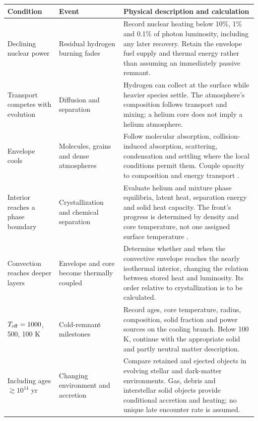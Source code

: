 {\small\renewcommand{\arraystretch}{1.16}
\begin{tabular}{@{}>{\raggedright\arraybackslash}p{}
 >{\raggedright\arraybackslash}p{}
 >{\raggedright\arraybackslash}p{}@{}}
\toprule
Condition & Event & Physical description and calculation \\\midrule
Declining nuclear power & Residual hydrogen burning fades &
Record nuclear heating below 10\%, 1\% and 0.1\% of photon luminosity,
including any later recovery. Retain the envelope fuel supply and thermal
energy rather than assuming an immediately passive remnant. \\[4pt]
Transport competes with evolution & Diffusion and separation &
Hydrogen can collect at the surface while heavier species settle. The
atmosphere's composition follows transport and mixing; a helium core does
not imply a helium atmosphere. \\[4pt]
Envelope cools & Molecules, grains and dense atmospheres &
Follow molecular absorption, collision-induced absorption, scattering,
condensation and settling where the local conditions permit them. Couple
opacity to composition and energy transport \cite{chabrier00,blouin18}. \\[4pt]
Interior reaches a phase boundary & Crystallization and chemical separation &
Evaluate helium and mixture phase equilibria, latent heat, separation energy
and solid heat capacity. The front's progress is determined by density and
core temperature, not one assigned surface temperature \cite{baiko22}. \\[4pt]
Convection reaches deeper layers & Envelope and core become thermally coupled &
Determine whether and when the convective envelope reaches the nearly
isothermal interior, changing the relation between stored heat and luminosity.
Its order relative to crystallization is to be calculated. \\[4pt]
$T_{\rm eff}=1000$, 500, 100 K & Cold-remnant milestones &
Record ages, core temperature, radius, composition, solid fraction and power
sources on the cooling branch. Below 100 K, continue with the appropriate
solid and partly neutral matter description. \\[4pt]
Including ages $\gtrsim10^{14}$ yr & Changing environment and accretion &
Compare retained and ejected objects in evolving stellar and dark-matter
environments. Gas, debris and interstellar solid objects provide conditional
accretion and heating; no unique late encounter rate is assumed. \\[4pt]

\end{tabular}}
